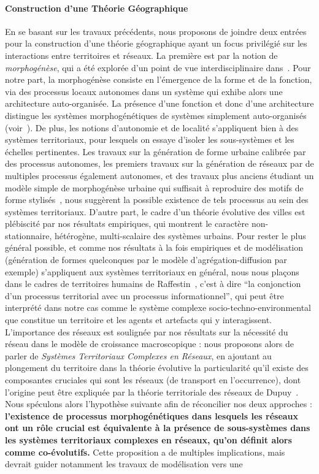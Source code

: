 \paragraph{Construction d'une Théorie Géographique}

En se basant sur les travaux précédents, nous proposons de joindre deux entrées pour la construction d'une théorie géographique ayant un focus privilégié sur les interactions entre territoires et réseaux. La première est par la notion de \emph{morphogénèse}, qui a été explorée d'un point de vue interdisciplinaire dans~\cite{antelope2016interdisciplinary}. Pour notre part, la morphogénèse consiste en l'émergence de la forme et de la fonction, via des processus locaux autonomes dans un système qui exhibe alors une architecture auto-organisée. La présence d'une fonction et donc d'une architecture distingue les systèmes morphogénétiques de systèmes simplement auto-organisés (voir~\cite{doursat2012morphogenetic}). De plus, les notions d'autonomie et de localité s'appliquent bien à des systèmes territoriaux, pour lesquels on essaye d'isoler les sous-systèmes et les échelles pertinentes. Les travaux sur la génération de forme urbaine calibrée par des processus autonomes, les premiers travaux sur la génération de réseaux par de multiples processus également autonomes, et des travaux plus anciens étudiant un modèle simple de morphogénèse urbaine qui suffisait à reproduire des motifs de forme stylisés~\cite{raimbault2014hybrid}, nous suggèrent la possible existence de tels processus au sein des systèmes territoriaux. D'autre part, le cadre d'un théorie évolutive des villes est plébiscité par nos résultats empiriques, qui montrent le caractère non-stationnaire, hétérogène, multi-scalaire des systèmes urbains. Pour rester le plus général possible, et comme nos résultats à la fois empiriques et de modélisation (génération de formes quelconques par le modèle d'agrégation-diffusion par exemple) s'appliquent aux systèmes territoriaux en général, nous nous plaçons dans le cadres de territoires humains de Raffestin~\cite{raffestin1988reperes}, c'est à dire ``la conjonction d'un processus territorial avec un processus informationnel'', qui peut être interprété dans notre cas comme le système complexe socio-techno-environmental que constitue un territoire et les agents et artefacts qui y interagissent. L'importance des réseaux est soulignée par nos résultats sur la nécessité du réseau dans le modèle de croissance macroscopique : nous proposons alors de parler de \emph{Systèmes Territoriaux Complexes en Réseaux}, en ajoutant au plongement du territoire dans la théorie évolutive la particularité qu'il existe des composantes cruciales qui sont les réseaux (de transport en l'occurrence), dont l'origine peut être expliquée par la théorie territoriale des réseaux de Dupuy~\cite{dupuy1987vers}. Nous spéculons alors l'hypothèse suivante afin de réconcilier nos deux approches : \textbf{l'existence de processus morphogénétiques dans lesquels les réseaux ont un rôle crucial est équivalente à la présence de sous-systèmes dans les systèmes territoriaux complexes en réseaux, qu'on définit alors comme co-évolutifs.} Cette proposition a de multiples implications, mais devrait guider notamment les travaux de modélisation vers une 